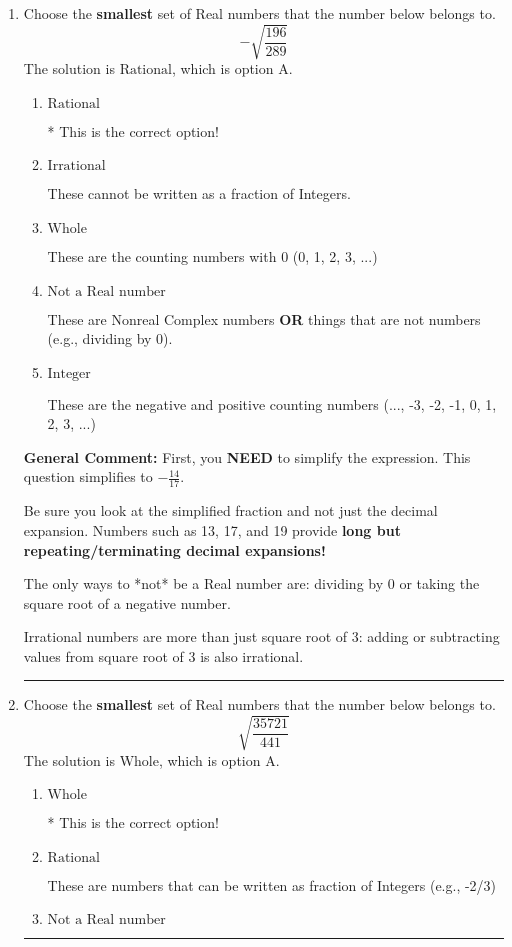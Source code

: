 \documentclass{extbook}[14pt]
\newcommand{\litem}[1]{\item #1

\rule{\textwidth}{0.4pt}}
\begin{document}
\begin{enumerate}\litem{
Choose the \textbf{smallest} set of Real numbers that the number below belongs to.
\[ -\sqrt{\frac{196}{289}} \]The solution is \( \text{Rational} \), which is option A.\begin{enumerate}[label=\Alph*.]
\item \( \text{Rational} \)

* This is the correct option!
\item \( \text{Irrational} \)

These cannot be written as a fraction of Integers.
\item \( \text{Whole} \)

These are the counting numbers with 0 (0, 1, 2, 3, ...)
\item \( \text{Not a Real number} \)

These are Nonreal Complex numbers \textbf{OR} things that are not numbers (e.g., dividing by 0).
\item \( \text{Integer} \)

These are the negative and positive counting numbers (..., -3, -2, -1, 0, 1, 2, 3, ...)
\end{enumerate}

\textbf{General Comment:} First, you \textbf{NEED} to simplify the expression. This question simplifies to $-\frac{14}{17}$. 
 
 Be sure you look at the simplified fraction and not just the decimal expansion. Numbers such as 13, 17, and 19 provide \textbf{long but repeating/terminating decimal expansions!} 
 
 The only ways to *not* be a Real number are: dividing by 0 or taking the square root of a negative number. 
 
 Irrational numbers are more than just square root of 3: adding or subtracting values from square root of 3 is also irrational.
}
\litem{
Choose the \textbf{smallest} set of Real numbers that the number below belongs to.
\[ \sqrt{\frac{35721}{441}} \]The solution is \( \text{Whole} \), which is option A.\begin{enumerate}[label=\Alph*.]
\item \( \text{Whole} \)

* This is the correct option!
\item \( \text{Rational} \)

These are numbers that can be written as fraction of Integers (e.g., -2/3)
\item \( \text{Not a Real number} \)


\end{enumerate}}
\end{enumerate}
\end{document}
